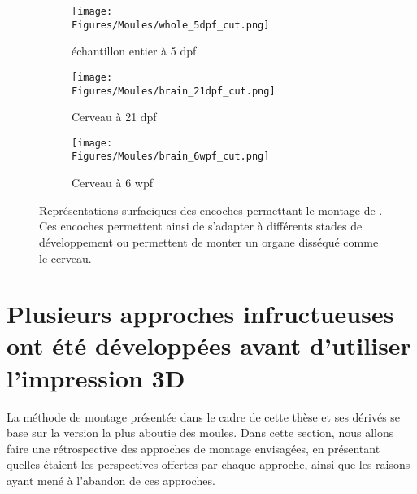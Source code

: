 \documentclass[\main/main.tex]{subfiles}
\begin{document}
\begin{figure}[htbp]
    \centering
    \begin{subfigure}[b]{0.37674418604651162790697674418605\textwidth}
       \caption{
            \label{fig:formes:whole_5dpf}
            échantillon entier à 5 dpf
            }
       \centering \texttt{[image: \\Figures/Moules/whole\_5dpf\_cut.png]}
    \end{subfigure}
    \begin{subfigure}[b]{0.26162790697674418604651162790698\textwidth}
       \caption{
            \label{fig:formes:brain_21dpf}
            Cerveau à 21 dpf
            }
       \centering \texttt{[image: \\Figures/Moules/brain\_21dpf\_cut.png]}
    \end{subfigure}
    \begin{subfigure}[b]{0.26162790697674418604651162790698\textwidth}
       \caption{
            \label{fig:formes:brain_6wpf}
            Cerveau à 6 wpf
            }
       \centering \texttt{[image: \\Figures/Moules/brain\_6wpf\_cut.png]}
    \end{subfigure}
    \caption{
        \label{fig:formes}
        Représentations surfaciques des encoches permettant le montage de \pzs. Ces encoches permettent ainsi de s'adapter à différents stades de développement ou permettent de monter un organe disséqué comme le cerveau.
    }
    
\end{figure}
    
    \section{Plusieurs approches infructueuses ont été développées avant d'utiliser l'impression 3D}
 
%
La méthode de montage présentée dans le cadre de cette thèse et ses dérivés se base sur la version la plus aboutie des moules.
%
Dans cette section, nous allons faire une rétrospective des approches de montage envisagées, en présentant quelles étaient les perspectives offertes par chaque approche, ainsi que les raisons ayant mené à l'abandon de ces approches.
\end{document}
